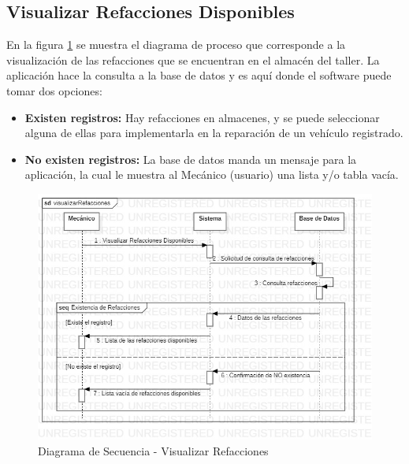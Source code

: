 \subsection{Visualizar Refacciones Disponibles}
En la figura \ref{fig:Diagrama de Secuencia - Visualizar Refacciones} se muestra el diagrama de proceso que corresponde a la visualización de las refacciones que se encuentran en el almacén del taller. La aplicación hace la consulta a la base de datos y es aquí donde el software puede tomar dos opciones: 
\begin{itemize}
	\item \textbf{Existen registros:} Hay refacciones en almacenes, y se puede seleccionar alguna de ellas para implementarla en la reparación de un vehículo registrado.
	\item \textbf{No existen registros:} La base de datos manda un mensaje para la aplicación, la cual le muestra al Mecánico (usuario) una lista y/o tabla vacía. 
\end{itemize} 
\begin{figure}[!h]
	\centering
	\includegraphics[width=1\textwidth]{./diseno/vprocesos/imagenes/visualizarRefacciones}
	\caption{Diagrama de Secuencia - Visualizar Refacciones}
	\label{fig:Diagrama de Secuencia - Visualizar Refacciones}
\end{figure}